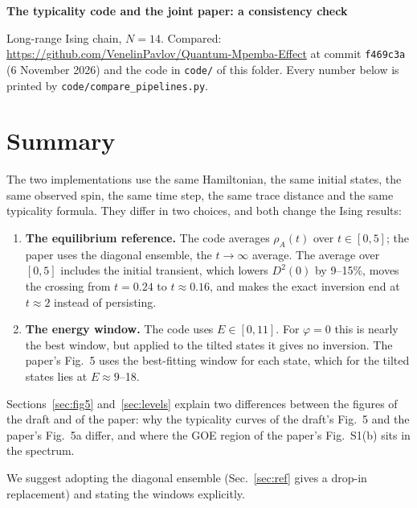\documentclass[11pt]{article}
\newcommand{\code}[1]{\texttt{#1}}
\begin{document}
{\Large\bfseries The typicality code and the joint paper: a consistency check}\par\medskip
{\small\raggedright Long-range Ising chain, $N=14$. Compared: \url{https://github.com/VenelinPavlov/Quantum-Mpemba-Effect} at commit \code{f469c3a} (6 November 2026) and the code in \code{code/} of this folder. Every number below is printed by \code{code/compare\_pipelines.py}.\par}

\section*{Summary}
The two implementations use the same Hamiltonian, the same initial states, the same observed spin, the same time step, the same trace distance and the same typicality formula. They differ in two choices, and both change the Ising results:
\begin{enumerate}\setlength{\itemsep}{2pt}
\item \textbf{The equilibrium reference.} The code averages $\rho_A(t)$ over $t\in[0,5]$; the paper uses the diagonal ensemble, the $t\to\infty$ average. The average over $[0,5]$ includes the initial transient, which lowers $D^2(0)$ by 9--15\%, moves the crossing from $t=0.24$ to $t\approx0.16$, and makes the exact inversion end at $t\approx2$ instead of persisting.
\item \textbf{The energy window.} The code uses $E\in[0,11]$. For $\varphi=0$ this is nearly the best window, but applied to the tilted states it gives no inversion. The paper's Fig.~5 uses the best-fitting window for each state, which for the tilted states lies at $E\approx9$--18.
\end{enumerate}
Sections~\ref{sec:fig5} and~\ref{sec:levels} explain two differences between the figures of the draft and of the paper: why the typicality curves of the draft's Fig.~5 and the paper's Fig.~5a differ, and where the GOE region of the paper's Fig.~S1(b) sits in the spectrum.

We suggest adopting the diagonal ensemble (Sec.~\ref{sec:ref} gives a drop-in replacement) and stating the windows explicitly.
\end{document}
